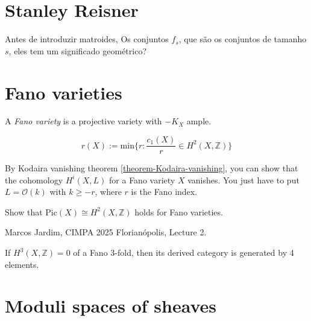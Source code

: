 \section{Stanley Reisner}
\label{section-}

Antes de introduzir matroides, Os conjuntos $f_s$, que são os conjuntos de
tamanho $s$, eles tem um significado geométrico?



\section{Fano varieties}
\label{section-Fano-varieties}

\begin{definition}
\label{definition-Fano-variety}
A {\it Fano variety} is a projective variety with $-K_X$ ample.
\end{definition}

\begin{definition}
\label{definition-Fano-index}
$$
r(X):=\text{min}\{r:\frac{c_1(X)}{r}\in H^{2}(X,\mathbb{Z})\}
$$
\end{definition}

\begin{exercise}
\label{exercise-Fano-vanishing-higher-cohomology}
By Kodaira vanishing theorem \ref{theorem-Kodaira-vanishing}, 
you can show that the cohomology $H^{i}(X,L)$ for
a Fano variety $X$ vanishes. You just have to put $L=\mathcal{O}(k)$ with $k\geq
-r$, where $r$ is the Fano index.
\end{exercise}

\begin{exercise}
\label{exercise-Pic-H2-Fano}
Show that  $\text{Pic}(X)\cong H^{2}(X,\mathbb{Z})$ holds for Fano varieties.
\end{exercise}

\begin{remark}
\label{remark-derived-category-of-Fano-3-folds-with-vanishing-simplicial
-cohomology}
\begin{reference}
Marcos Jardim, CIMPA 2025 Florianópolis, Lecture 2.
\end{reference}
If $H^3(X,\mathbb{Z})=0$ of a Fano 3-fold, then its derived category is
generated by 4 elements.
\end{remark}


\section{Moduli spaces of sheaves}
\label{section-moduli-spaces-of-sheaves}


